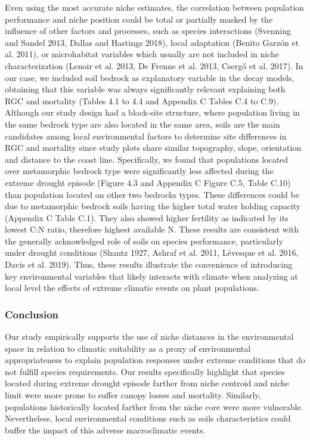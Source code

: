 \documentclass[11pt,twoside]{reedthesis}
\begin{document}
Even using the most accurate niche estimates, the correlation between
population performance and niche position could be total or partially
masked by the influence of other factors and processes, such as species
interactions (Svenning and Sandel 2013, Dallas and Hastings 2018), local
adaptation (Benito Garzón et al. 2011), or microhabitat variables which
usually are not included in niche characterization (Lenoir et al. 2013,
De Frenne et al. 2013, Csergő et al. 2017). In our case, we included
soil bedrock as explanatory variable in the decay models, obtaining that
this variable was always significantly relevant explaining both RGC and
mortality (Tables 4.1 to 4.4 and Appendix C Tables C.4 to C.9). Although
our study design had a block-site structure, where population living in
the same bedrock type are also located in the same area, soils are the
main candidates among local environmental factors to determine site
differences in RGC and mortality since study plots share similar
topography, slope, orientation and distance to the coast line.
Specifically, we found that populations located over metamorphic bedrock
type were significantly less affected during the extreme drought episode
(Figure 4.3 and Appendix C Figure C.5, Table C.10) than population
located on other two bedrocks types. These differences could be due to
metamorphic bedrock soils having the higher total water holding capacity
(Appendix C Table C.1). They also showed higher fertility as indicated
by its lowest C:N ratio, therefore highest available N. These results
are consistent with the generally acknowledged role of soils on species
performance, particularly under drought conditions (Shantz 1927, Ashraf
et al. 2011, Lévesque et al. 2016, Davis et al. 2019). Thus, these
results illustrate the convenience of introducing key environmental
variables that likely interacts with climate when analyzing at local
level the effects of extreme climatic events on plant populations.\par

\subsubsection{Conclusion}\label{conclusion-1}

Our study empirically supports the use of niche distances in the
environmental space in relation to climatic suitability as a proxy of
environmental appropriateness to explain population responses under
extreme conditions that do not fulfill species requirements. Our results
specifically highlight that species located during extreme drought
episode farther from niche centroid and niche limit were more prone to
suffer canopy losses and mortality. Similarly, populations historically
located farther from the niche core were more vulnerable. Nevertheless,
local environmental conditions such as soils characteristics could
buffer the impact of this adverse macroclimatic events.\par
\end{document}
